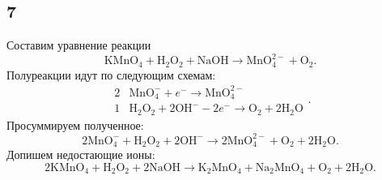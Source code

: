 \subsection{7}

Составим уравнение реакции
\[
\mathrm{KMnO_4}+\mathrm{H_2O_2}+\mathrm{NaOH}\longrightarrow\mathrm{MnO_4^{2-}}+\mathrm{O_2}.
\]
Полуреакции идут по следующим схемам:
\[
\begin{array}{r|l}
	2 & \mathrm{MnO_4^-}+e^-\longrightarrow\mathrm{MnO_4^{2-}} \\
	1 & \mathrm{H_2O_2}+2\mathrm{OH^-}-2e^-\longrightarrow\mathrm{O_2}+2\mathrm{H_2O}
\end{array}.
\]
Просуммируем полученное:
\[
2\mathrm{MnO_4^-}+\mathrm{H_2O_2}+2\mathrm{OH^-}\longrightarrow2\mathrm{MnO_4^{2-}}+\mathrm{O_2}+2\mathrm{H_2O}.
\]
Допишем недостающие ионы:
\[
2\mathrm{KMnO_4}+\mathrm{H_2O_2}+2\mathrm{NaOH}\longrightarrow\mathrm{K_2MnO_4}+\mathrm{Na_2MnO_4}+\mathrm{O_2}+2\mathrm{H_2O}.
\]